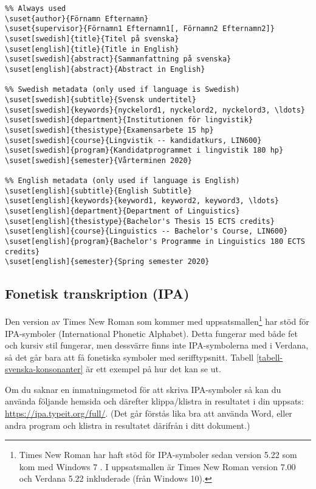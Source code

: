 \begin{verbatim}
%% Always used
\suset{author}{Förnamn Efternamn}
\suset{supervisor}{Förnamn1 Efternamn1[, Förnamn2 Efternamn2]}
\suset[swedish]{title}{Titel på svenska}
\suset[english]{title}{Title in English}
\suset[swedish]{abstract}{Sammanfattning på svenska}
\suset[english]{abstract}{Abstract in English}

%% Swedish metadata (only used if language is Swedish)
\suset[swedish]{subtitle}{Svensk undertitel}
\suset[swedish]{keywords}{nyckelord1, nyckelord2, nyckelord3, \ldots}
\suset[swedish]{department}{Institutionen för lingvistik}
\suset[swedish]{thesistype}{Examensarbete 15 hp}
\suset[swedish]{course}{Lingvistik -- kandidatkurs, LIN600}
\suset[swedish]{program}{Kandidatprogrammet i lingvistik 180 hp}
\suset[swedish]{semester}{Vårterminen 2020}

%% English metadata (only used if language is English)
\suset[english]{subtitle}{English Subtitle}
\suset[english]{keywords}{keyword1, keyword2, keyword3, \ldots}
\suset[english]{department}{Department of Linguistics}
\suset[english]{thesistype}{Bachelor's Thesis 15 ECTS credits}
\suset[english]{course}{Linguistics -- Bachelor's Course, LIN600}
\suset[english]{program}{Bachelor's Programme in Linguistics 180 ECTS credits}
\suset[english]{semester}{Spring semester 2020}
\end{verbatim}


\subsection{Fonetisk transkription (IPA)}
\label{ipa}

Den version av Times New Roman som kommer med uppsatsmallen\footnote{Times New
  Roman har haft stöd för IPA-symboler sedan version 5.22 \citep{ipa} som kom
  med Windows 7 \citep{win-7-fonts}. I uppsatsmallen är Times New Roman version
  7.00 och Verdana 5.22 inkluderade (från Windows 10).} har stöd för
IPA-symboler (International Phonetic Alphabet). Detta fungerar med både fet och
kursiv stil fungerar, men dessvärre finns inte IPA-symbolerna med i Verdana, så
det går bara att få fonetiska symboler med serifftypsnitt. Tabell
\ref{tabell-svenska-konsonanter} är ett exempel på hur det kan se ut.

Om du saknar en inmatningsmetod för att skriva IPA-symboler så kan du använda
följande hemsida och därefter klippa/klistra in resultatet i din uppsats:
\url{https://ipa.typeit.org/full/}. (Det går förstås lika bra att använda Word,
eller andra program och klistra in resultatet därifrån i ditt dokument.)

